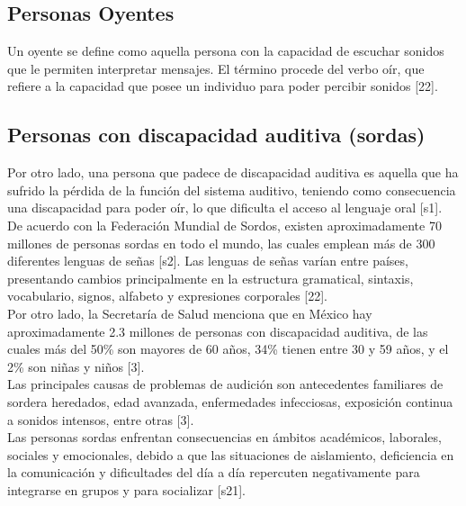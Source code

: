 \subsection{Personas Oyentes}
Un oyente se define como aquella persona con la capacidad de escuchar sonidos que le permiten interpretar mensajes. El término procede del verbo oír, que refiere a la capacidad que posee un individuo para poder percibir sonidos [22].

\subsection{Personas con discapacidad auditiva (sordas)}
Por otro lado, una persona que padece de discapacidad auditiva es aquella que ha sufrido la pérdida de la función del sistema auditivo, teniendo como consecuencia una discapacidad para poder oír, lo que dificulta el acceso al lenguaje oral [s1].\\ 

De acuerdo con la Federación Mundial de Sordos, existen aproximadamente 70 millones de personas sordas en todo el mundo, las cuales emplean más de 300 diferentes lenguas de señas [s2]. Las lenguas de señas varían entre países, presentando cambios principalmente en la estructura gramatical, sintaxis, vocabulario, signos, alfabeto y expresiones corporales [22].\\

Por otro lado, la Secretaría de Salud menciona que en México hay aproximadamente 2.3 millones de personas con discapacidad auditiva, de las cuales más del 50\% son mayores de 60 años, 34\% tienen entre 30 y 59 años, y el 2\% son niñas y niños [3].\\

Las principales causas de problemas de audición son antecedentes familiares de sordera heredados, edad avanzada, enfermedades infecciosas, exposición continua a sonidos intensos, entre otras [3].\\

Las personas sordas enfrentan consecuencias en ámbitos académicos, laborales, sociales y emocionales, debido a que las situaciones de aislamiento, deficiencia en la comunicación y dificultades del día a día repercuten negativamente para integrarse en grupos y para socializar [s21]. \\


